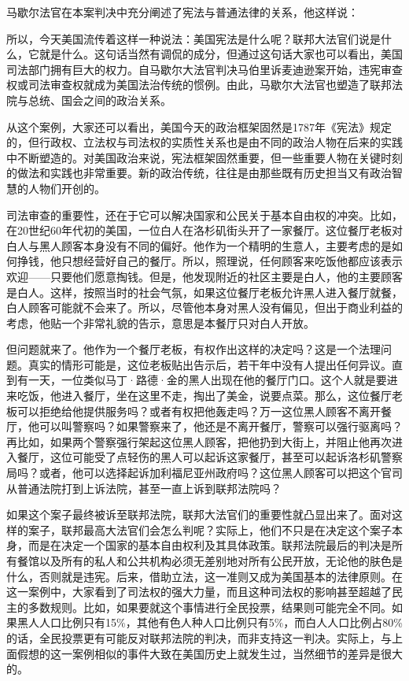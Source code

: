 马歇尔法官在本案判决中充分阐述了宪法与普通法律的关系，他这样说：


所以，今天美国流传着这样一种说法：美国宪法是什么呢？联邦大法官们说是什么，它就是什么。这句话当然有调侃的成分，但通过这句话大家也可以看出，美国司法部门拥有巨大的权力。自马歇尔大法官判决马伯里诉麦迪逊案开始，违宪审查权或司法审查权就成为美国法治传统的惯例。由此，马歇尔大法官也塑造了联邦法院与总统、国会之间的政治关系。

从这个案例，大家还可以看出，美国今天的政治框架固然是1787年《宪法》规定的，但行政权、立法权与司法权的实质性关系也是由不同的政治人物在后来的实践中不断塑造的。对美国政治来说，宪法框架固然重要，但一些重要人物在关键时刻的做法和实践也非常重要。新的政治传统，往往是由那些既有历史担当又有政治智慧的人物们开创的。

司法审查的重要性，还在于它可以解决国家和公民关于基本自由权的冲突。比如，在20世纪60年代初的美国，一位白人在洛杉矶街头开了一家餐厅。这位餐厅老板对白人与黑人顾客本身没有不同的偏好。他作为一个精明的生意人，主要考虑的是如何挣钱，他只想经营好自己的餐厅。所以，照理说，任何顾客来吃饭他都应该表示欢迎——只要他们愿意掏钱。但是，他发现附近的社区主要是白人，他的主要顾客是白人。这样，按照当时的社会气氛，如果这位餐厅老板允许黑人进入餐厅就餐，白人顾客可能就不会来了。所以，尽管他本身对黑人没有偏见，但出于商业利益的考虑，他贴一个非常礼貌的告示，意思是本餐厅只对白人开放。

但问题就来了。他作为一个餐厅老板，有权作出这样的决定吗？这是一个法理问题。真实的情形可能是，这位老板贴出告示后，若干年中没有人提出任何异议。直到有一天，一位类似马丁·路德·金的黑人出现在他的餐厅门口。这个人就是要进来吃饭，他进入餐厅，坐在这里不走，掏出了美金，说要点菜。那么，这位餐厅老板可以拒绝给他提供服务吗？或者有权把他轰走吗？万一这位黑人顾客不离开餐厅，他可以叫警察吗？如果警察来了，他还是不离开餐厅，警察可以强行驱离吗？再比如，如果两个警察强行架起这位黑人顾客，把他扔到大街上，并阻止他再次进入餐厅，这位可能受了点轻伤的黑人可以起诉这家餐厅，甚至可以起诉洛杉矶警察局吗？或者，他可以选择起诉加利福尼亚州政府吗？这位黑人顾客可以把这个官司从普通法院打到上诉法院，甚至一直上诉到联邦法院吗？

如果这个案子最终被诉至联邦法院，联邦大法官们的重要性就凸显出来了。面对这样的案子，联邦最高大法官们会怎么判呢？实际上，他们不只是在决定这个案子本身，而是在决定一个国家的基本自由权利及其具体政策。联邦法院最后的判决是所有餐馆以及所有的私人和公共机构必须无差别地对所有公民开放，无论他的肤色是什么，否则就是违宪。后来，借助立法，这一准则又成为美国基本的法律原则。在这一案例中，大家看到了司法权的强大力量，而且这种司法权的影响甚至超越了民主的多数规则。比如，如果要就这个事情进行全民投票，结果则可能完全不同。如果黑人人口比例只有15\%，其他有色人种人口比例只有5\%，而白人人口比例占80\%的话，全民投票更有可能反对联邦法院的判决，而非支持这一判决。实际上，与上面假想的这一案例相似的事件大致在美国历史上就发生过，当然细节的差异是很大的。

